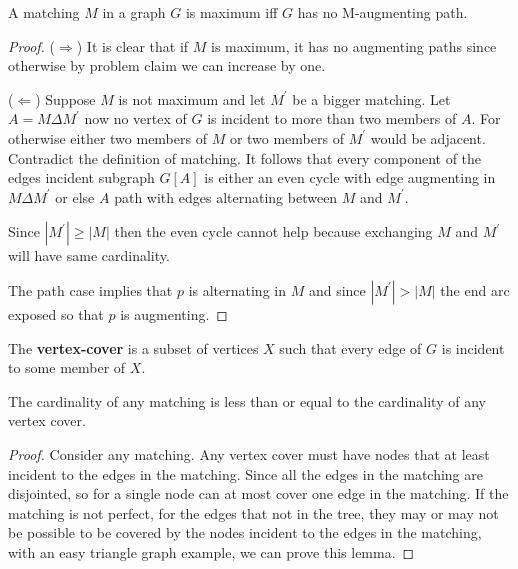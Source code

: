 			\begin{theorem}[Berge, 1957]
				A matching $M$ in a graph $G$ is maximum iff $G$ has no M-augmenting path.
			\end{theorem}

			\begin{proof}
				($\Rightarrow$) It is clear that if $M$ is maximum, it has no augmenting paths since otherwise by problem claim we can increase by one.

				($\Leftarrow$) Suppose $M$ is not maximum and let $M^\prime$ be a bigger matching. Let $A = M \Delta M^\prime$ now no vertex of $G$ is incident to more than two members of $A$. For otherwise either two members of $M$ or two members of $M^\prime$ would be adjacent. Contradict the definition of matching. It follows that every component of the edges incident subgraph $G[A]$ is either an even cycle with edge augmenting in $M\Delta M^\prime$ or else $A$ path with edges alternating between $M$ and $M^\prime$.

				Since $|M^\prime| \ge |M|$ then the even cycle cannot help because exchanging $M$ and $M^\prime$ will have same cardinality.

				The path case implies that $p$ is alternating in $M$ and since $|M^\prime| > |M|$ the end arc exposed so that $p$ is augmenting.
			\end{proof}

			\begin{definition}
				The \textbf{vertex-cover} is a subset of vertices $X$ such that every edge of $G$ is incident to some member of $X$.
			\end{definition}

			\begin{lemma}
				The cardinality of any matching is less than or equal to the cardinality of any vertex cover.
			\end{lemma}

			\begin{proof}
				Consider any matching. Any vertex cover must have nodes that at least incident to the edges in the matching. Since all the edges in the matching are disjointed, so for a single node can at most cover one edge in the matching. If the matching is not perfect, for the edges that not in the tree, they may or may not be possible to be covered by the nodes incident to the edges in the matching, with an easy triangle graph example, we can prove this lemma.
			\end{proof}

